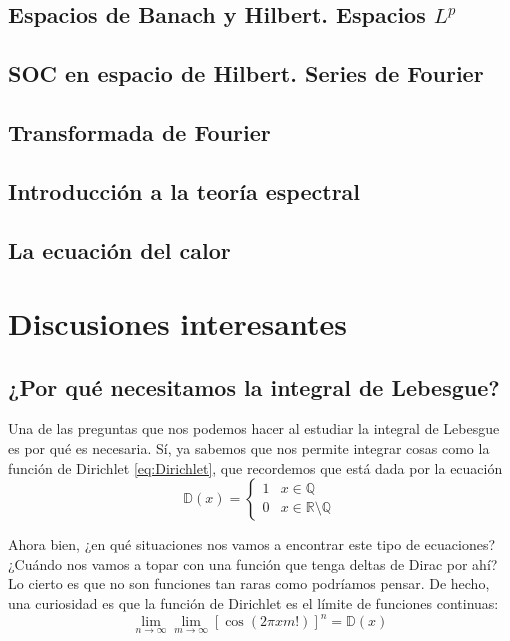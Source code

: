 \documentclass[nochap,palatino]{apuntes}
\begin{document}
\section{Espacios de Banach y Hilbert. Espacios $L^p$}

\section{SOC en espacio de Hilbert. Series de Fourier}

\section{Transformada de Fourier}

\section{Introducción a la teoría espectral}

\section{La ecuación del calor}

\appendix

\chapter{Discusiones interesantes}
\label{chap:Discusiones}

\section{¿Por qué necesitamos la integral de Lebesgue?}
\label{sec:MotivacionLebesgue}

Una de las preguntas que nos podemos hacer al estudiar la integral de Lebesgue es por qué es necesaria. Sí, ya sabemos que nos permite integrar cosas como la función de Dirichlet \eqref{eq:Dirichlet}, que recordemos que está dada por la ecuación \[ \mathbb{D}(x) = \begin{cases} 1 & x ∈ ℚ \\ 0 & x ∈ ℝ \setminus ℚ \end{cases} \]

Ahora bien, ¿en qué situaciones nos vamos a encontrar este tipo de ecuaciones? ¿Cuándo nos vamos a topar con una función que tenga deltas de Dirac por ahí? Lo cierto es que no son funciones tan raras como podríamos pensar. De hecho, una curiosidad es que la función de Dirichlet es el límite de funciones continuas: \[ \lim_{n\to ∞} \lim_{m\to ∞} \left[\cos (2πxm!)\right]^n = \mathbb{D}(x) \]
\end{document}
